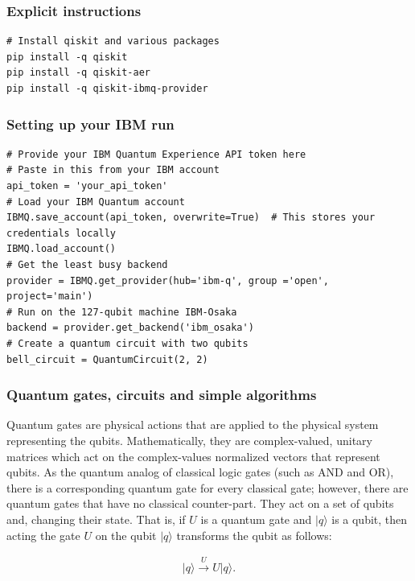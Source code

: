 \documentclass{beamer}
\begin{document}
\begin{frame}
\frametitle{Explicit instructions}

\begin{verbatim}
# Install qiskit and various packages
pip install -q qiskit
pip install -q qiskit-aer
pip install -q qiskit-ibmq-provider

\end{verbatim}
\end{frame}

\begin{frame}
\frametitle{Setting up your IBM run}

\begin{verbatim}
# Provide your IBM Quantum Experience API token here
# Paste in this from your IBM account
api_token = 'your_api_token'
# Load your IBM Quantum account
IBMQ.save_account(api_token, overwrite=True)  # This stores your credentials locally
IBMQ.load_account()
# Get the least busy backend
provider = IBMQ.get_provider(hub='ibm-q', group ='open', project='main')
# Run on the 127-qubit machine IBM-Osaka
backend = provider.get_backend('ibm_osaka')
# Create a quantum circuit with two qubits
bell_circuit = QuantumCircuit(2, 2)

\end{verbatim}
\end{frame}

\begin{frame}
\frametitle{Quantum gates, circuits and simple algorithms}

Quantum gates are physical actions that are applied to the physical
system representing the qubits. Mathematically, they are
complex-valued, unitary matrices which act on the complex-values
normalized vectors that represent qubits. As the quantum analog of
classical logic gates (such as AND and OR), there is a corresponding
quantum gate for every classical gate; however, there are quantum
gates that have no classical counter-part. They act on a set of qubits
and, changing their state. That is, if $U$ is a quantum gate and
$\vert q \rangle $ is a qubit, then acting the gate $U$ on the qubit $\vert q \rangle $
transforms the qubit as follows:

\begin{align}
\vert q \rangle \overset{U}{\to}U\vert q \rangle 
.\end{align}
\end{frame}
\end{document}
